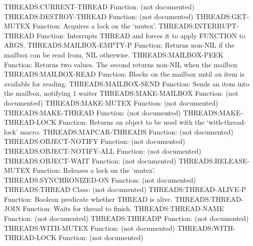THREADS:CURRENT-THREAD
  Function: (not documented)
THREADS:DESTROY-THREAD
  Function: (not documented)
THREADS:GET-MUTEX
  Function: Acquires a lock on the `mutex'.
THREADS:INTERRUPT-THREAD
  Function: Interrupts THREAD and forces it to apply FUNCTION to ARGS.
THREADS:MAILBOX-EMPTY-P
  Function: Returns non-NIL if the mailbox can be read from, NIL otherwise.
THREADS:MAILBOX-PEEK
  Function: Returns two values. The second returns non-NIL when the mailbox
THREADS:MAILBOX-READ
  Function: Blocks on the mailbox until an item is available for reading.
THREADS:MAILBOX-SEND
  Function: Sends an item into the mailbox, notifying 1 waiter
THREADS:MAKE-MAILBOX
  Function: (not documented)
THREADS:MAKE-MUTEX
  Function: (not documented)
THREADS:MAKE-THREAD
  Function: (not documented)
THREADS:MAKE-THREAD-LOCK
  Function: Returns an object to be used with the `with-thread-lock' macro.
THREADS:MAPCAR-THREADS
  Function: (not documented)
THREADS:OBJECT-NOTIFY
  Function: (not documented)
THREADS:OBJECT-NOTIFY-ALL
  Function: (not documented)
THREADS:OBJECT-WAIT
  Function: (not documented)
THREADS:RELEASE-MUTEX
  Function: Releases a lock on the `mutex'.
THREADS:SYNCHRONIZED-ON
  Function: (not documented)
THREADS:THREAD
  Class: (not documented)
THREADS:THREAD-ALIVE-P
  Function: Boolean predicate whether THREAD is alive.
THREADS:THREAD-JOIN
  Function: Waits for thread to finish.
THREADS:THREAD-NAME
  Function: (not documented)
THREADS:THREADP
  Function: (not documented)
THREADS:WITH-MUTEX
  Function: (not documented)
THREADS:WITH-THREAD-LOCK
  Function: (not documented)
